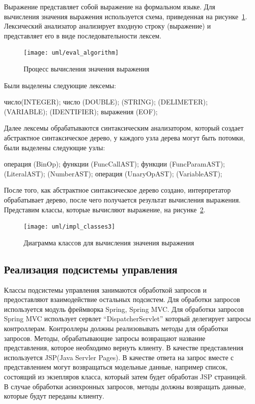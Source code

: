 \documentclass[14pt,a4paper]{reportmod}
\begin{document}
Выражение представляет собой выражение на формальном языке. Для вычисления значения выражения используется схема, приведенная на рисунке~\ref{pic:evalprocess}. Лексический анализатор анализирует входную строку (выражение) и представляет его в виде последовательности лексем.

\begin{figure}
  \centering
  \texttt{[image: uml/eval\_algorithm]}
  \caption{Процесс вычисления значения выражения}
  \label{pic:evalprocess}
\end{figure}

Были выделены следующие лексемы:

\begin{itemize}
   число(INTEGER);
   число (DOUBLE);
   (STRING);
   (DELIMETER);
   (VARIABLE);
   (IDENTIFIER);
   выражения (EOF);
\end{itemize}

Далее лексемы обрабатываются синтаксическим анализатором, который создает абстрактное синтаксическое дерево, у каждого узла дерева могут быть потомки, были выделены следующие узлы:
\begin{itemize}
   операция (BinOp);
   функции (FuncCallAST);
   функции (FuncParamAST);
   (LiteralAST);
   (NumberAST);
   операция (UnaryOpAST);
   (VariableAST);
\end{itemize}

После того, как абстрактное синтаксическое дерево создано, интерпретатор обрабатывает дерево, после чего получается результат вычисления выражения. Представим классы, которые вычисляют выражение, на рисунке~\ref{pic:evalclasses}.

\begin{figure}
  \centering
  \texttt{[image: uml/impl\_classes3]}
  \caption{Диаграмма классов для вычисления значения выражения}
  \label{pic:evalclasses}
\end{figure}

\subsection{Реализация подсистемы управления}

Классы подсистемы управления занимаются обработкой запросов и предоставляют взаимодействие остальных подсистем. Для обработки запросов используется модуль фреймворка Spring, Spring MVC. Для обработки запросов Spring MVC использует сервлет ``DispatcherServlet'' который делегирует запросы контроллерам. Контроллеры должны реализовывать методы для обработки запросов. Методы, обрабатывающие запросы возвращают название представления, которое необходимо вернуть клиенту. В качестве представления используется JSP(Java Servler Pages). В качестве ответа на запрос вместе с представлением могут возвращаться модельные данные, например список, состоящий из экзепляров класса, который затем будет обработан JSP страницей.
В случае обработки асинхронных запросов, методы должны возвращать данные, которые будут переданы клиенту.
\end{document}
